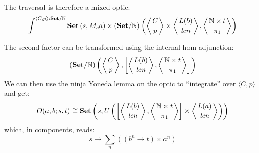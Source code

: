 \documentclass[11pt]{amsart}
\begin{document}
The traversal is therefore a mixed optic:
\[ \int^{\langle C, p \rangle : \mathbf{Set}/\mathbb{N}} \mathbf{Set} 
\left(s,  M_c a \right)  
  \times (\mathbf{Set}/\mathbb{N})\left( \left \langle {C \atop p} \right \rangle 
  \times \left \langle {L(b) \atop \mathit{len}} \right \rangle, \left \langle {\mathbb{N} \times t \atop \pi_1} \right \rangle \right) \]

The second factor can be transformed using the internal hom adjunction:
\[ 
(\mathbf{Set}/\mathbb{N})\left(\left \langle {C \atop p} \right \rangle, \left[ \left \langle {L(b) \atop \mathit{len}} \right \rangle, \left \langle {\mathbb{N} \times t \atop \pi_1} \right \rangle \right] \right) \]
We can then use the ninja Yoneda lemma on the optic to ``integrate'' over $\langle C, p \rangle$ and get:
\[ O(a, b; s, t) \cong \mathbf{Set} \left(  s, U\left( 
  \left[ \left \langle {L(b) \atop \mathit{len}} \right \rangle, \left \langle {\mathbb{N} \times t \atop \pi_1} \right \rangle \right] \times \left \langle {L(a) \atop \mathit{len}} \right \rangle \right) \right) \]
which, in components, reads:
\[ s \to \sum_n \left( (b^n \to t) \times a^n \right) \]
\end{document}
